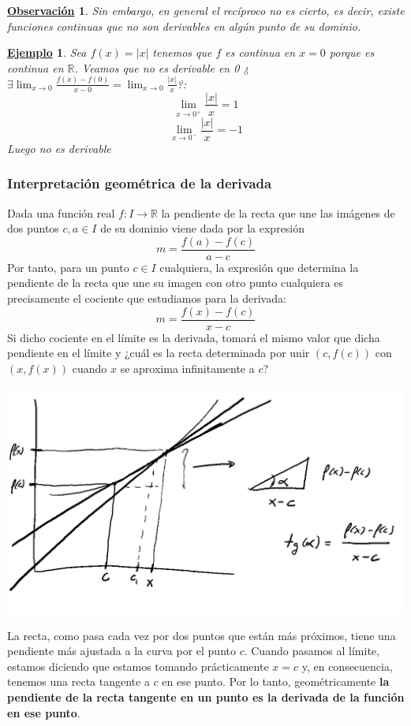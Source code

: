 \documentclass[10pt,a4paper,openright]{book}
\theoremstyle{break}
\newtheorem{obs}{\underline{Observación}}[chapter]
\newtheorem{ej}{\underline{Ejemplo}}[chapter]
\begin{document}
\begin{obs}
Sin embargo, en general el recíproco no es cierto, es decir, existe funciones continuas que no son derivables en algún punto de su dominio.
\end{obs}

\begin{ej}
Sea $f(x)=|x|$ tenemos que $f$ es continua en $x=0$ porque es continua en $\mathbb R$. Veamos que no es derivable en 0 ¿$\exists \lim_{x\rightarrow 0} \frac{f(x)-f(0)}{x-0}= \lim_{x\rightarrow 0}\frac{|x|}{x}$?:
$$\lim_{x\rightarrow 0^+} \frac{|x|}{x}=1$$
$$\lim_{x\rightarrow 0^-} \frac{|x|}{x}=-1$$
Luego no es derivable
\end{ej}

\subsubsection{Interpretación geométrica de la derivada}
Dada una función real $f:I \rightarrow \mathbb R$ la pendiente de la recta que une las imágenes de dos puntos $c,a\in I$ de su dominio viene dada por la expresión
$$m = \frac{f(a)-f(c)}{a-c}$$
Por tanto, para un punto $c\in I$ cualquiera, la expresión que determina la pendiente de la recta que une su imagen con otro punto cualquiera es precisamente el cociente que estudiamos para la derivada:
$$m = \frac{f(x)-f(c)}{x-c}$$
Si dicho cociente en el límite es la derivada, tomará el mismo valor que dicha pendiente en el límite y ¿cuál es la recta determinada por unir $(c, f(c))$ con $(x, f(x))$ cuando $x$ se aproxima infinitamente a $c$?

\begin{center}
\includegraphics[scale=0.64]{Interpretacion derivada}
\end{center}

La recta, como pasa cada vez por dos puntos que están más próximos, tiene una pendiente más ajustada a la curva por el punto $c$. Cuando pasamos al límite, estamos diciendo que estamos tomando prácticamente $x=c$ y, en consecuencia, tenemos una recta tangente a $c$ en ese punto. Por lo tanto, geométricamente \textbf{la pendiente de la recta tangente en un punto es la derivada de la función en ese punto}.
\end{document}
